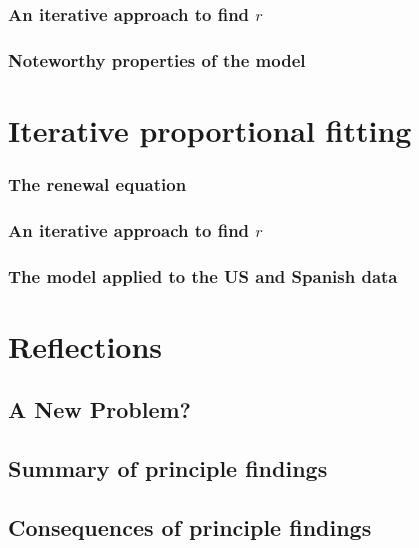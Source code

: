     \subsection{An iterative approach to find $r$}
      
      
    \subsection{Noteworthy properties of the model}
      
  \chapter{Iterative proportional fitting}
      
    \subsection{The renewal equation}
      
    \subsection{An iterative approach to find $r$}
      
    \subsection{The model applied to the US and Spanish data}
      
\chapter{Reflections}
  \section{A New Problem?}
    
  \section{Summary of principle findings}
    
  \section{Consequences of principle findings}
    

